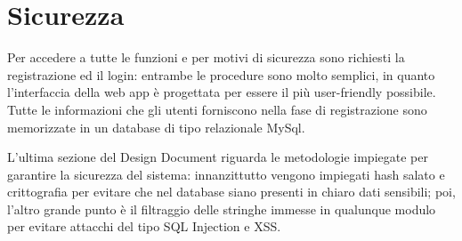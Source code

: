 \section{Sicurezza}

Per accedere a tutte le funzioni e per motivi di sicurezza sono richiesti la registrazione ed il login: entrambe le procedure sono molto semplici, in quanto l'interfaccia della web app è progettata per essere il più
user-friendly possibile. Tutte le informazioni che gli utenti forniscono nella fase di registrazione sono memorizzate in un database di tipo relazionale MySql.

L'ultima sezione del Design Document riguarda le metodologie impiegate per garantire la sicurezza del sistema: innanzittutto vengono impiegati hash salato e crittografia per evitare che nel database siano presenti in chiaro dati sensibili; poi, l'altro grande punto è il filtraggio delle stringhe immesse in qualunque modulo per evitare attacchi del tipo SQL Injection e XSS.